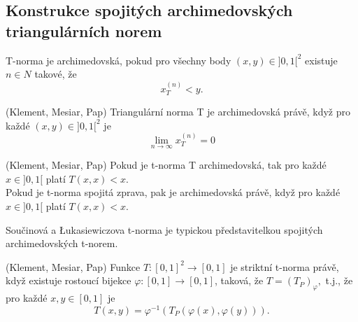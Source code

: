 \subsection{Konstrukce spojitých archimedovských triangulárních norem}
\begin{definition}
    T-norma je archimedovská, pokud pro všechny body $(x,y) \in ]0,1[^2$ existuje $n \in N$ takové, že $$x_T^{(n)} < y.$$
\end{definition}
\begin{sentence} (Klement, Mesiar, Pap)
    Triangulární norma T je archimedovská právě, když pro každé $(x,y) \in ]0,1[^2$ je $$\lim_{n \to \infty}x_T^{(n)} = 0$$
\end{sentence}
\begin{sentence} (Klement, Mesiar, Pap)
    Pokud je t-norma T archimedovská, tak pro každé $x \in ]0,1[$ platí $T(x,x) < x.$\\
    Pokud je t-norma spojitá zprava, pak je archimedovská právě, když pro každé $x \in ]0,1[$ platí $T(x,x) < x.$
\end{sentence}

    Součinová a Łukasiewiczova t-norma je typickou představitelkou spojitých archimedovských t-norem.
\begin{sentence} (Klement, Mesiar, Pap)
    Funkce $ T:[0,1]^2 \rightarrow [0,1]$ je
    striktní t-norma právě, když existuje
    rostoucí bijekce $\varphi:[0,1] \rightarrow [0,1]$, taková, že
    $T=(T_P)_\varphi,$ t.j., že
    pro každé $x,y \in [0,1]$ je
    $$T(x,y)=\varphi^{-1}(T_P(\varphi(x),\varphi(y))).$$
\end{sentence}


